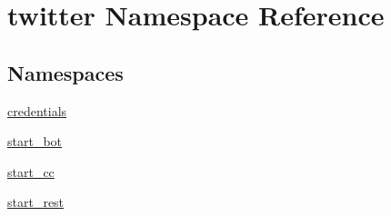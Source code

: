 \hypertarget{namespacetwitter}{}\section{twitter Namespace Reference}
\label{namespacetwitter}
\subsection*{Namespaces}
\begin{DoxyCompactItemize}
\item 
 \hyperlink{namespacetwitter_1_1credentials}{credentials}
\item 
 \hyperlink{namespacetwitter_1_1start__bot}{start\+\_\+bot}
\item 
 \hyperlink{namespacetwitter_1_1start__cc}{start\+\_\+cc}
\item 
 \hyperlink{namespacetwitter_1_1start__rest}{start\+\_\+rest}
\end{DoxyCompactItemize}
